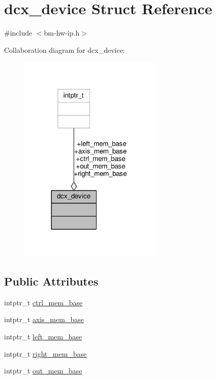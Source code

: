 \hypertarget{structdcx__device}{}\section{dcx\+\_\+device Struct Reference}
\label{structdcx__device}


{\ttfamily \#include $<$bm-\/hw-\/ip.\+h$>$}



Collaboration diagram for dcx\+\_\+device\+:
\nopagebreak
\begin{figure}[H]
\begin{center}
\leavevmode
\includegraphics[width=192pt]{structdcx__device__coll__graph}
\end{center}
\end{figure}
\subsection*{Public Attributes}
\begin{DoxyCompactItemize}
\item 
intptr\+\_\+t \hyperlink{structdcx__device_a3564f065dedea6d4f215494e5549e394}{ctrl\+\_\+mem\+\_\+base}
\item 
intptr\+\_\+t \hyperlink{structdcx__device_a8de2b1be5c945cdffefb71048c430a52}{axis\+\_\+mem\+\_\+base}
\item 
intptr\+\_\+t \hyperlink{structdcx__device_aed5c8d74ac51c66da80b13c85e143b90}{left\+\_\+mem\+\_\+base}
\item 
intptr\+\_\+t \hyperlink{structdcx__device_a2878b0cea2e70a7a7d7299baa8f41d74}{right\+\_\+mem\+\_\+base}
\item 
intptr\+\_\+t \hyperlink{structdcx__device_a79059bdde1dae2b52111e4c0c723c356}{out\+\_\+mem\+\_\+base}
\end{DoxyCompactItemize}


